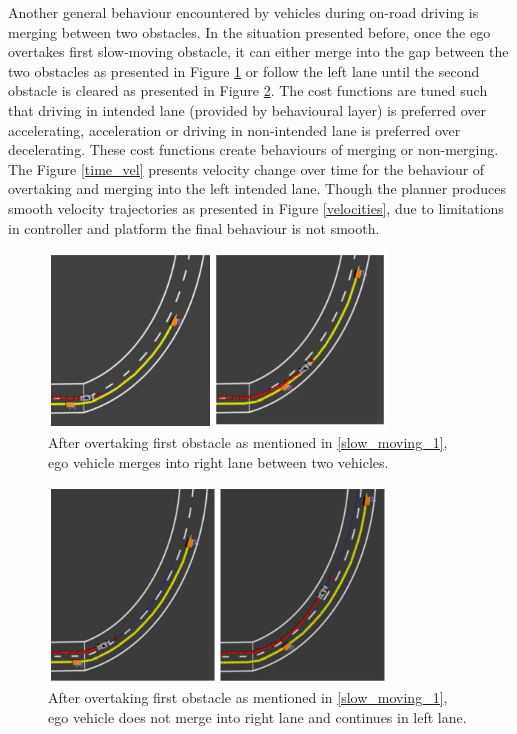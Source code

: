 Another general behaviour encountered by vehicles during on-road driving is merging between two obstacles. In the situation presented before, once the ego overtakes first slow-moving obstacle, it can either merge into the gap between the two obstacles as presented in Figure \ref{merging_1} or follow the left lane until the second obstacle is cleared as presented in Figure \ref{no_merge}. The cost functions are tuned such that driving in intended lane (provided by behavioural layer) is preferred over accelerating, acceleration or driving in non-intended lane is preferred over decelerating. These cost functions create behaviours of merging or non-merging. The Figure \ref{time_vel} presents velocity change over time for the behaviour of overtaking and merging into the left intended lane. Though the planner produces smooth velocity trajectories as presented in Figure \ref{velocities}, due to limitations in controller and platform the final behaviour is not smooth.

\begin{figure}
	\centering
	\includegraphics[width=0.8\textwidth]{Images/evaluation/merging_1.jpg}
	\caption{After overtaking first obstacle as mentioned in \ref{slow_moving_1}, ego vehicle merges into right lane between two vehicles.}
	\label{merging_1}
\end{figure}

\begin{figure}
	\centering
	\includegraphics[width=0.8\textwidth]{Images/evaluation/no_merging.jpg}
	\caption{After overtaking first obstacle as mentioned in \ref{slow_moving_1}, ego vehicle does not merge into right lane and continues in left lane.}
	\label{no_merge}
\end{figure}


